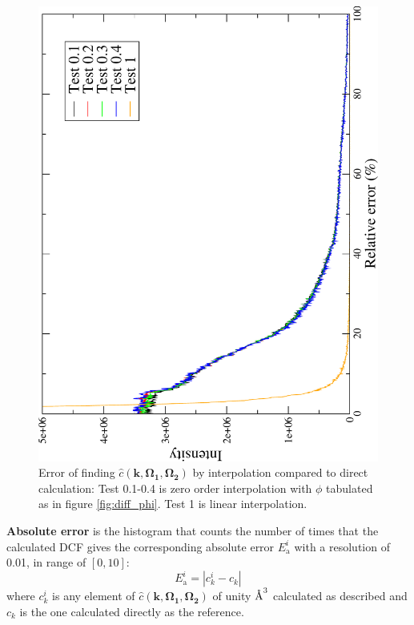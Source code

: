 \begin{figure}[h]
\begin{minipage}[t]{1.1\textwidth}
\begin{center}
\par\end{center}
\begin{center}
\includegraphics[angle=-90,scale=0.3]{_figure/c_local_to_global_coordinates_32_96/relative_error}
\par\end{center}
\caption[Error of finding $\hat{c}(\mathbf{k},\mathbf{\Omega_{1}},\mathbf{\Omega_{2}})$
by interpolation compared to direct calculation]{Error of finding $\hat{c}(\mathbf{k},\mathbf{\Omega_{1}},\mathbf{\Omega_{2}})$
by interpolation compared to direct calculation: Test 0.1-0.4 is zero
order interpolation with $\phi$ tabulated as in figure \ref{fig:diff_phi}.
Test 1 is linear interpolation.\label{fig:error}}
%
\end{minipage}
\end{figure}

\textbf{Absolute error} is the histogram that counts the number of
times that the calculated DCF gives the corresponding absolute error
$E_{\mathrm{a}}^{i}$ with a resolution of 0.01, in range of $[0,10]$:
\begin{equation}
E_{\mathrm{a}}^{i}=\left|c_{k}^{i}-c_{k}\right|
\end{equation}
where $c_{k}^{i}$ is any element of $\hat{c}(\mathbf{k},\mathbf{\Omega_{1}},\mathbf{\Omega_{2}})$
of unity $\lyxmathsym{\AA}^{3}$ calculated as described and $c_{k}$
is the one calculated directly as the reference.

